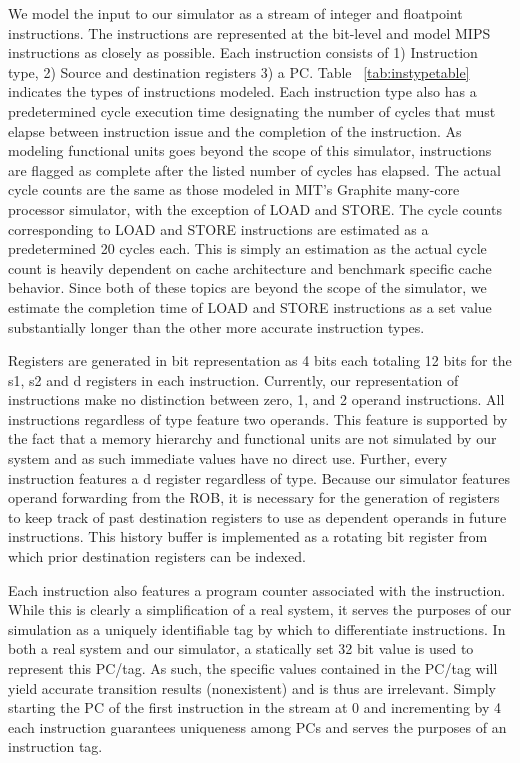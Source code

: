 \documentclass{acm_proc_article-sp}
\begin{document}
We model the input to our simulator as a stream of integer and floatpoint instructions.  The instructions are represented at the bit-level and model MIPS instructions as closely as possible.  Each instruction consists of 1) Instruction type, 2) Source and destination registers 3) a PC.  Table ~\ref{tab:instypetable} indicates the types of instructions modeled.  Each instruction type also has a predetermined cycle execution time designating the number of cycles that must elapse between instruction issue and the completion of the instruction.  As modeling functional units goes beyond the scope of this simulator, instructions are flagged as complete after the listed number of cycles has elapsed.  The actual cycle counts are the same as those modeled in MIT's Graphite many-core processor simulator\cite{graphite}, with the exception of LOAD and STORE.  The cycle counts corresponding to LOAD and STORE instructions are estimated as a predetermined 20 cycles each.  This is simply an estimation as the actual cycle count is heavily dependent on cache architecture and benchmark specific cache behavior.  Since both of these topics are beyond the scope of the simulator, we estimate the completion time of LOAD and STORE instructions as a set value substantially longer than the other more accurate instruction types.

Registers are generated in bit representation as 4 bits each totaling 12 bits for the s1, s2 and d registers in each instruction. Currently, our representation of instructions make no distinction between zero, 1, and 2 operand instructions.  All instructions regardless of type feature two operands.  This feature is supported by the fact that a memory hierarchy and functional units are not simulated by our system and as such immediate values have no direct use.  Further, every instruction features a d register regardless of type.  Because our simulator features operand forwarding from the ROB, it is necessary for the generation of registers to keep track of past destination registers to use as dependent operands in future instructions.  This history buffer is implemented as a rotating bit register from which prior destination registers can be indexed.

Each instruction also features a program counter associated with the instruction.  While this is clearly a simplification of a real system, it serves the purposes of our simulation as a uniquely identifiable tag by which to differentiate instructions.  In both a real system and our simulator, a statically set 32 bit value is used to represent this PC/tag.  As such, the specific values contained in the PC/tag will yield accurate transition results (nonexistent) and is thus are irrelevant.  Simply starting the PC of the first instruction in the stream at 0 and incrementing by 4 each instruction guarantees uniqueness among PCs and serves the purposes of an instruction tag.
\end{document}
